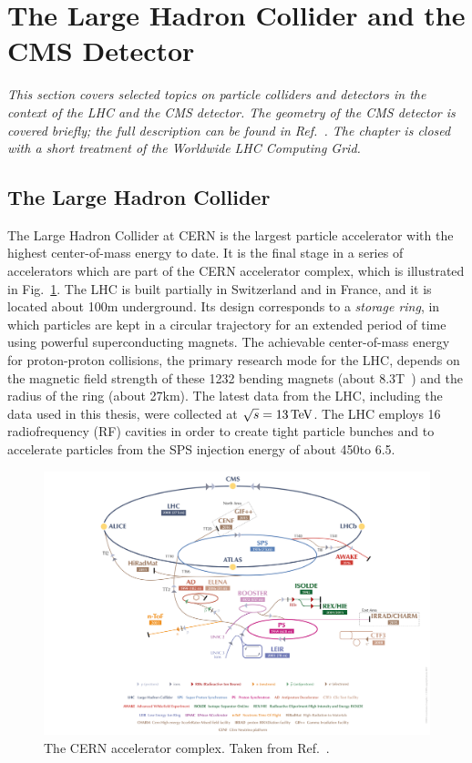 \section{The Large Hadron Collider and the CMS Detector}

\emph{%
This section covers selected topics on particle colliders and detectors in the context of the LHC and the CMS detector.
% 
The geometry of the CMS detector is covered briefly; the full description can be found in Ref.~\cite{Chatrchyan:2008zzk}.
% 
The chapter is closed with a short treatment of the Worldwide LHC Computing Grid.
}


\subsection{The Large Hadron Collider}

The Large Hadron Collider at CERN is the largest particle accelerator with the highest center-of-mass energy to date.
% 
It is the final stage in a series of accelerators which are part of the CERN accelerator complex, which is illustrated in Fig.~\ref{fig:cernacceleratorcomplex}.
% 
The LHC is built partially in Switzerland and in France, and it is located about 100\unit{m} underground.
% 
Its design corresponds to a \textit{storage ring}, in which particles are kept in a circular trajectory for an extended period of time using powerful superconducting magnets.
% 
The achievable center-of-mass energy for proton-proton collisions, the primary research mode for the LHC, depends on the magnetic field strength of these 1232 bending magnets (about 8.3\unit{T}~\cite{lhc}) and the radius of the ring (about 27\unit{km}).
% 
The latest data from the LHC, including the data used in this thesis, were collected at $\sqrt{s}=13\,\text{TeV}$.
% 
The LHC employs 16 radiofrequency (RF) cavities in order to create tight particle bunches and to accelerate particles from the SPS injection energy of about 450\GeV to 6.5\TeV.


\begin{figure}[hbtp]
  \begin{center}
    \includegraphics[width=\linewidth]{img/detector/cernacceleratorcomplex_small.png}
    \caption{
        The CERN accelerator complex. Taken from Ref.~\cite{cernacceleratorcomplex}.
        }
    \label{fig:cernacceleratorcomplex}
  \end{center}
\end{figure}


